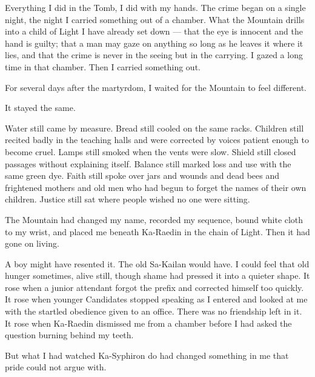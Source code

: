 
Everything I did in the Tomb, I did with my hands. The crime began on a single night, the night I carried something out of a chamber. What the Mountain drills into a child of Light I have already set down --- that the eye is innocent and the hand is guilty; that a man may gaze on anything so long as he leaves it where it lies, and that the crime is never in the seeing but in the carrying. I gazed a long time in that chamber. Then I carried something out.\par

\ornament

For several days after the martyrdom, I waited for the Mountain to feel different.\par

It stayed the same.\par

Water still came by measure.
Bread still cooled on the same racks.
Children still recited badly in the teaching halls and were corrected by voices patient enough to become cruel.
Lamps still smoked when the vents were slow.
Shield still closed passages without explaining itself.
Balance still marked loss and use with the same green dye.
Faith still spoke over jars and wounds and dead bees and frightened mothers and old men who had begun to forget the names of their own children.
Justice still sat where people wished no one were sitting.\par

The Mountain had changed my name, recorded my sequence, bound white cloth to my wrist, and placed me beneath Ka-Raedin in the chain of Light.
Then it had gone on living.\par

A boy might have resented it. The old Sa-Kailan would have. I could feel that old hunger sometimes, alive still, though shame had pressed it into a quieter shape. It rose when a junior attendant forgot the prefix and corrected himself too quickly. It rose when younger Candidates stopped speaking as I entered and looked at me with the startled obedience given to an office. There was no friendship left in it. It rose when Ka-Raedin dismissed me from a chamber before I had asked the question burning behind my teeth.\par

But what I had watched Ka-Syphiron do had changed something in me that pride could not argue with.\par

